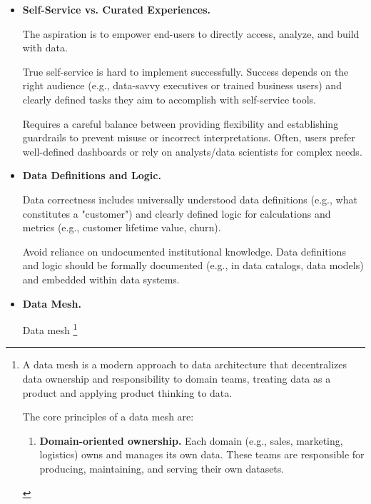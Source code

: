 \begin{itemize}
    \noindent
    A product that facilitates an end goal through the use of data
    (e.g., a curated dataset, a dashboard, a recommendation engine).
    Development involves collaboration between technology,
    product, and business stakeholders. Understand the
    "job to be done" for the user
    \footnote{
        Successful data products often generate more data through
        usage, which can then be used to improve the product
        further. Adoption hinges on utility and trust.
    }.


    \item \textbf{Self-Service vs. Curated Experiences.}
    
    \noindent
    The aspiration is to empower end-users to directly access,
    analyze, and build with data.

    True self-service is hard to implement successfully.
    Success depends on the right audience (e.g., data-savvy
    executives or trained business users) and clearly defined
    tasks they aim to accomplish with self-service tools.

    Requires a careful balance between providing flexibility
    and establishing guardrails to prevent misuse or incorrect
    interpretations. Often, users prefer well-defined dashboards
    or rely on analysts/data scientists for complex needs.


    \item \textbf{Data Definitions and Logic.}
    
    \noindent
    Data correctness includes universally understood data
    definitions (e.g., what constitutes a "customer")
    and clearly defined logic for calculations and metrics
    (e.g., customer lifetime value, churn).

    Avoid reliance on undocumented institutional knowledge.
    Data definitions and logic should be formally documented
    (e.g., in data catalogs, data models) and embedded within
    data systems.


    \item \textbf{Data Mesh.}
    
    \noindent
    Data mesh
    \footnote{
        A data mesh is a modern approach to data architecture
        that decentralizes data ownership and responsibility
        to domain teams, treating data as a product and
        applying product thinking to data.

        The core principles of a data mesh are:
        \begin{enumerate}
            \item \textbf{Domain-oriented ownership.} Each domain
            (e.g., sales, marketing, logistics) owns and
            manages its own data. These teams are responsible
            for producing, maintaining, and serving their own
            datasets.


\end{enumerate}}
\end{itemize}
